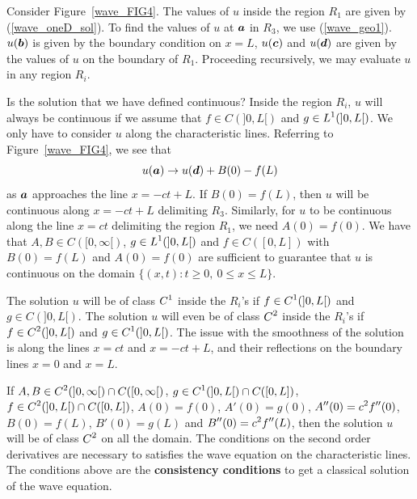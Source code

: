 \begin{egg}
Consider Figure~\ref{wave_FIG4}.  The values of $u$ inside the region
$R_1$ are given by (\ref{wave_oneD_sol}).  To find the values of $u$
at ${\bm{a}}$ in $R_3$, we use (\ref{wave_geo1}).  $u({\bm{b}})$ is
given by the boundary condition on $x=L$,  $u({\bm{c}})$ and
$u({\bm{d}})$ are given by the values of $u$ on the boundary of $R_1$.
Proceeding recursively, we may evaluate $u$ in any region $R_i$.
\label{wave_egg1}


Is the solution that we have defined continuous?  Inside the region
$R_i$, $u$ will always be continuous if we assume that $f\in C(]0,L[)$
and $\displaystyle g\in L^1(]0,L[)$.  We only have to consider $u$ along the
characteristic lines.  Referring to Figure~\ref{wave_FIG4},
we see that
\begin{equation} \label{wave_geo2}
u({\bm{a}}) \rightarrow u({\bm{d}}) + B(0) - f(L)
\end{equation}
as ${\bm{a}}$ approaches the line $x=-ct+L$.  If $B(0)=f(L)$, then $u$
will be continuous along $x=-ct+L$ delimiting $R_3$.  Similarly, for
$u$ to be continuous along the line $x=ct$ delimiting the region $R_1$,
we need $A(0)=f(0)$.  We have that
$A,B \in C([0,\infty[)$, $\displaystyle g \in L^1(]0,L[)$ and $f\in C([0,L])$
with $B(0)=f(L)$ and $A(0) = f(0)$ are sufficient to guarantee that
$u$ is continuous on the domain
$\{ (x,t) : t\geq 0, \ 0 \leq x \leq L \}$.

The solution $u$ will be of class $\displaystyle C^1$ inside the $R_i$'s if
$\displaystyle f\in C^1(]0,L[)$ and $g \in C(]0,L[)$.  The solution
$u$ will even be of class $\displaystyle C^2$ inside the $R_i$'s if
$\displaystyle f\in C^2(]0,L[)$ and $\displaystyle g \in C^1(]0,L[)$.
The issue with the smoothness of the solution is along the lines $x= ct$ and
$x=-ct+L$, and their reflections on the boundary lines $x=0$ and $x=L$.

If $\displaystyle A,B \in C^2(]0,\infty[)\cap C([0,\infty[)$,
$\displaystyle g\in C^1(]0,L[)\cap C([0,L])$,
$\displaystyle f\in C^2(]0,L[)\cap C([0,L])$,
$A(0)=f(0)$, $A'(0)=g(0)$, $\displaystyle A''(0)= c^2 f''(0)$, $B(0)=f(L)$,
$B'(0)=g(L)$ and $\displaystyle B''(0)= c^2 f''(L)$, then
the solution $u$ will be of class $\displaystyle C^2$ on all the domain.
The conditions on the second order derivatives are necessary to
satisfies the wave equation on the characteristic lines.
The conditions above are the {\bfseries consistency
conditions} to get a
classical solution of the wave equation.
\end{egg}

